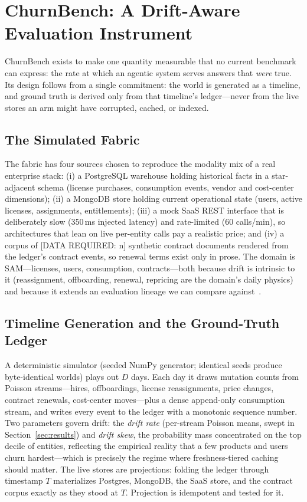 \documentclass{ieeeaccess}
\begin{document}
\section{ChurnBench: A Drift-Aware Evaluation Instrument}
\label{sec:churnbench}

ChurnBench exists to make one quantity measurable that no current benchmark can
express: the rate at which an agentic system serves answers that \emph{were} true.
Its design follows from a single commitment: the world is generated as a timeline,
and ground truth is derived only from that timeline's ledger---never from the live
stores an arm might have corrupted, cached, or indexed.

\subsection{The Simulated Fabric}
The fabric has four sources chosen to reproduce the modality mix of a real
enterprise stack: (i) a PostgreSQL warehouse holding historical facts in a
star-adjacent schema (license purchases, consumption events, vendor and
cost-center dimensions); (ii) a MongoDB store holding current operational state
(users, active licenses, assignments, entitlements); (iii) a mock SaaS REST
interface that is deliberately slow (350\,ms injected latency) and rate-limited
(60 calls/min), so architectures that lean on live per-entity calls pay a
realistic price; and (iv) a corpus of [DATA REQUIRED: n] synthetic contract
documents rendered from the ledger's contract events, so renewal terms exist
only in prose. The domain is SAM---licenses, users, consumption, contracts---both
because drift is intrinsic to it (reassignment, offboarding, renewal, repricing
are the domain's daily physics) and because it extends an evaluation lineage we
can compare against~\cite{saasrat, tca}.

\subsection{Timeline Generation and the Ground-Truth Ledger}
A deterministic simulator (seeded NumPy generator; identical seeds produce
byte-identical worlds) plays out $D$ days. Each day it draws mutation counts
from Poisson streams---hires, offboardings, license reassignments, price
changes, contract renewals, cost-center moves---plus a dense append-only
consumption stream, and writes every event to the ledger with a monotonic
sequence number. Two parameters govern drift: the \emph{drift rate} (per-stream
Poisson means, swept in Section~\ref{sec:results}) and \emph{drift skew}, the
probability mass concentrated on the top decile of entities, reflecting the
empirical reality that a few products and users churn hardest---which is
precisely the regime where freshness-tiered caching should matter. The live
stores are projections: folding the ledger through timestamp $T$ materializes
Postgres, MongoDB, the SaaS store, and the contract corpus exactly as they
stood at $T$. Projection is idempotent and tested for it.
\end{document}
